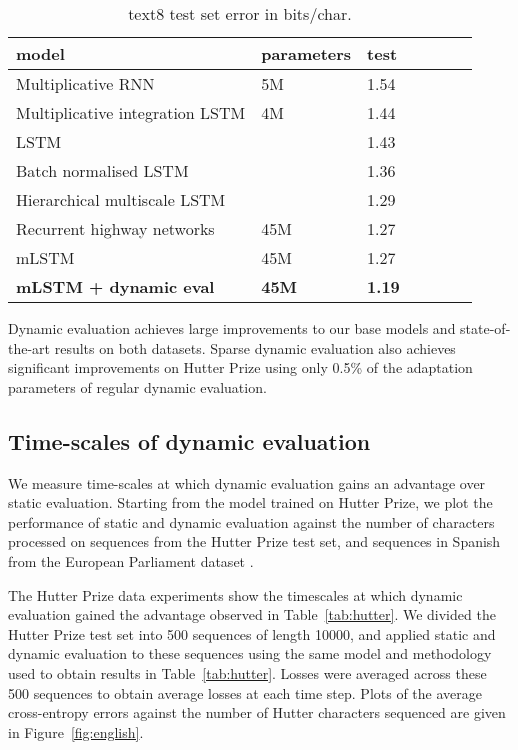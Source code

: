 \documentclass{article} \usepackage{iclr2018_conference,times}
\begin{document}
\begin{table}[tb]
\begin{center} 
\begin{tabular}{  l  l  l  l  l  l  l } \toprule 
model & parameters & test  \\ 
\midrule 
Multiplicative RNN \citep{mikolov2012subword}& 5M & 1.54 \\
Multiplicative integration LSTM \citep{wu2016}& 4M & 1.44 \\
LSTM \citep{cooijmans2017}& & 1.43 \\
Batch normalised LSTM \citep{cooijmans2017}& & 1.36 \\
Hierarchical multiscale LSTM \citep{chung2017}&  & 1.29 \\
Recurrent highway networks \citep{zilly2017}& 45M & 1.27 \\
\midrule 
mLSTM \citep{krause2016} &45M& 1.27 \\
\textbf{mLSTM + dynamic eval} &\textbf{45M} & \textbf{1.19} \\
\bottomrule
\end{tabular} 
\end{center}
\caption{text8 test set error in bits/char.}
\label{tab:text8}
\end{table}
Dynamic evaluation achieves large improvements to our base models and state-of-the-art results on both datasets. Sparse dynamic evaluation also achieves significant improvements on Hutter Prize using only 0.5\% of the adaptation parameters of regular dynamic evaluation.

\subsection{Time-scales of dynamic evaluation}
\label{sec:timescales}
We measure time-scales at which dynamic evaluation gains an advantage over static evaluation. Starting from the model trained on Hutter Prize, we plot the performance of static and dynamic evaluation against the number of characters processed on sequences from the Hutter Prize test set, and sequences in Spanish from the European Parliament dataset \citep{koehn2005}.


The Hutter Prize data experiments show the timescales at which dynamic evaluation gained the advantage observed in Table~\ref{tab:hutter}. We divided the Hutter Prize test set into 500 sequences of length 10000, and applied static and dynamic evaluation to these sequences using the same model and methodology used to obtain results in Table~\ref{tab:hutter}. Losses were averaged across these 500 sequences to obtain average losses at each time step. Plots of the average cross-entropy errors against the number of Hutter characters sequenced are given in Figure~\ref{fig:english}.
\end{document}
